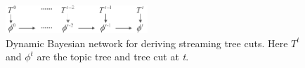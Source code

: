 \begin{figure}[t]
  \centering
  \includegraphics[width=2.1in]{fig/hmm2}
  \caption{
  Dynamic Bayesian network for deriving streaming tree cuts. Here $T^t$ and ${\phi}^t$ are the topic tree and tree cut at \emph{t}.
  }\label{fig:hmm}
  \vspace {-5mm}
\end{figure}


\begin{table}[b]
\small
    \vspace{-5mm}

    \centering
    \scalebox{0.8}{

}
\end{table}
